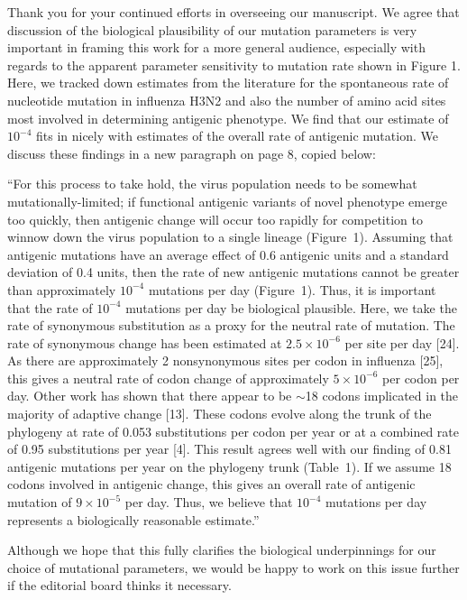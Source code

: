 \documentclass[stdletter,a4paper,noaddrfrom,orderfromdateto,11pt]{newlfm}
\begin{document}
\begin{newlfm}

Thank you for your continued efforts in overseeing our manuscript.  We agree that discussion of the biological plausibility of our mutation parameters is very important in framing this work for a more general audience, especially with regards to the apparent parameter sensitivity to mutation rate shown in Figure 1.  Here, we tracked down estimates from the literature for the spontaneous rate of nucleotide mutation in influenza H3N2 and also the number of amino acid sites most involved in determining antigenic phenotype.  We find that our estimate of $10^{-4}$ fits in nicely with estimates of the overall rate of antigenic mutation.  We discuss these findings in a new paragraph on page 8, copied below:

``For this process to take hold, the virus population needs to be somewhat mutationally-limited; if functional antigenic variants of novel phenotype emerge too quickly, then antigenic change will occur too rapidly for competition to winnow down the virus population to a single lineage (Figure~1).  Assuming that antigenic mutations have an average effect of 0.6 antigenic units and a standard deviation of 0.4 units, then the rate of new antigenic mutations cannot be greater than approximately $10^{-4}$ mutations per day (Figure~1).  Thus, it is important that the rate of $10^{-4}$ mutations per day be biological plausible.  Here, we take the rate of synonymous substitution as a proxy for the neutral rate of mutation.  The rate of synonymous change has been estimated at $2.5 \times 10^{-6}$ per site per day [24].  As there are approximately 2 nonsynonymous sites per codon in influenza [25], this gives a neutral rate of codon change of approximately $5 \times 10^{-6}$ per codon per day.  Other work has shown that there appear to be $\sim$18 codons implicated in the majority of adaptive change [13].  These codons evolve along the trunk of the phylogeny at rate of 0.053 substitutions per codon per year or at a combined rate of 0.95 substitutions per year [4].  This result agrees well with our finding of 0.81 antigenic mutations per year on the phylogeny trunk (Table~1).  If we assume 18 codons involved in antigenic change, this gives an overall rate of antigenic mutation of $9 \times 10^{-5}$ per day.  Thus, we believe that $10^{-4}$ mutations per day represents a biologically reasonable estimate.''

Although we hope that this fully clarifies the biological underpinnings for our choice of mutational parameters, we would be happy to work on this issue further if the editorial board thinks it necessary.

\end{newlfm}
\end{document}
